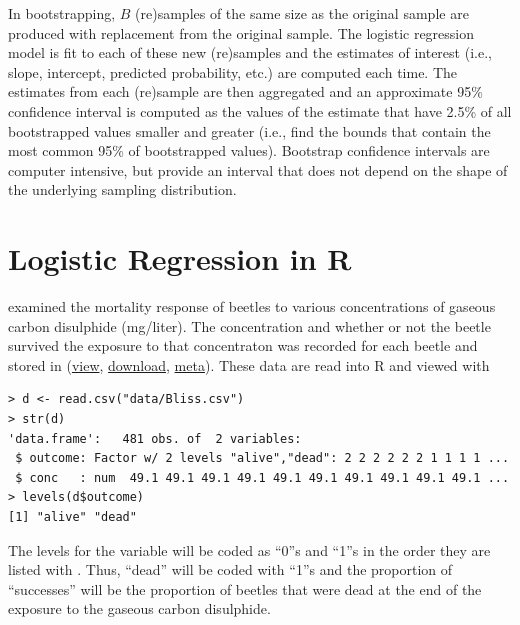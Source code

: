 \documentclass[10pt,openany]{book}\usepackage[]{graphicx}\usepackage[]{color}
\makeatletter
\newenvironment{kframe}{%
 \def\at@end@of@kframe{}%
 \ifinner\ifhmode%
  \def\at@end@of@kframe{\end{minipage}}%
  \begin{minipage}{\columnwidth}%
 \fi\fi%
 \def\FrameCommand##1{\hskip\@totalleftmargin \hskip-\fboxsep
 \colorbox{shadecolor}{##1}\hskip-\fboxsep
     \hskip-\linewidth \hskip-\@totalleftmargin \hskip\columnwidth}%
 \MakeFramed {\advance\hsize-\width
   \@totalleftmargin\z@ \linewidth\hsize
   \@setminipage}}%
 {\par\unskip\endMakeFramed%
 \at@end@of@kframe}
\newenvironment{knitrout}{}{} %
\makeatother
\begin{document}
In bootstrapping, $B$ (re)samples of the same size as the original sample are produced with replacement from the original sample.  The logistic regression model is fit to each of these new (re)samples and the estimates of interest (i.e., slope, intercept, predicted probability, etc.) are computed each time.  The estimates from each (re)sample are then aggregated and an approximate 95\% confidence interval is computed as the values of the estimate that have 2.5\% of all bootstrapped values smaller and greater (i.e., find the bounds that contain the most common 95\% of bootstrapped values).  Bootstrap confidence intervals are computer intensive, but provide an interval that does not depend on the shape of the underlying sampling distribution.

\section{Logistic Regression in R}
\cite{Bliss1935} examined the mortality response of beetles to various concentrations of gaseous carbon disulphide (mg/liter).  The concentration and whether or not the beetle survived the exposure to that concentraton was recorded for each beetle and stored in  (\href{https://github.com/droglenc/NCData/blob/master/Bliss.csv}{view}, \href{https://raw.githubusercontent.com/droglenc/NCData/master/Bliss.csv}{download}, \href{https://github.com/droglenc/NCData/blob/master/Bliss_meta.txt}{meta}).  These data are read into R and viewed with
\begin{knitrout}
\color{fgcolor}\begin{kframe}
\begin{verbatim}
> d <- read.csv("data/Bliss.csv")
> str(d)
'data.frame':	481 obs. of  2 variables:
 $ outcome: Factor w/ 2 levels "alive","dead": 2 2 2 2 2 2 1 1 1 1 ...
 $ conc   : num  49.1 49.1 49.1 49.1 49.1 49.1 49.1 49.1 49.1 49.1 ...
> levels(d$outcome)
[1] "alive" "dead" 
\end{verbatim}
\end{kframe}
\end{knitrout}
The levels for the  variable will be coded as ``0''s and ``1''s in the order they are listed with .  Thus, ``dead'' will be coded with ``1''s and the proportion of ``successes'' will be the proportion of beetles that were dead at the end of the exposure to the gaseous carbon disulphide.
\end{document}
